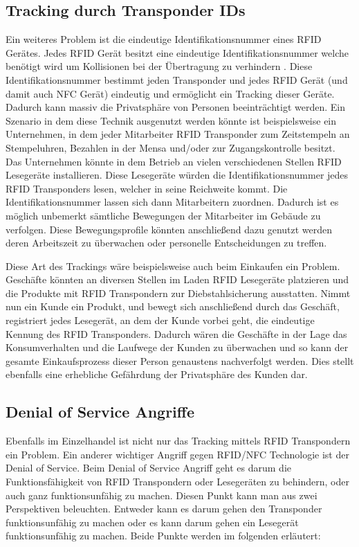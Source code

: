 \documentclass[conference]{IEEEtran}
\begin{document}
\subsection{Tracking durch Transponder IDs}
Ein weiteres Problem ist die eindeutige Identifikationsnummer eines RFID Gerätes. Jedes RFID Gerät besitzt eine eindeutige Identifikationsnummer welche benötigt wird um Kollisionen bei der Übertragung zu verhindern \cite{b3}. Diese Identifikationsnummer bestimmt jeden Transponder und jedes RFID Gerät (und damit auch NFC Gerät) eindeutig und ermöglicht ein Tracking dieser Geräte. Dadurch kann massiv die Privatsphäre von Personen beeinträchtigt werden. Ein Szenario in dem diese Technik ausgenutzt werden könnte ist beispielsweise ein Unternehmen, in dem jeder Mitarbeiter RFID Transponder zum Zeitstempeln an Stempeluhren, Bezahlen in der Mensa und/oder zur Zugangskontrolle besitzt. Das Unternehmen könnte in dem Betrieb an vielen verschiedenen Stellen RFID Lesegeräte installieren. Diese Lesegeräte würden die Identifikationsnummer jedes RFID Transponders lesen, welcher in seine Reichweite kommt. Die Identifikationsnummer lassen sich dann Mitarbeitern zuordnen. Dadurch ist es möglich unbemerkt sämtliche Bewegungen der Mitarbeiter im Gebäude zu verfolgen. Diese Bewegungsprofile könnten anschließend dazu genutzt werden deren Arbeitszeit zu überwachen oder personelle Entscheidungen zu treffen.

Diese Art des Trackings wäre beispielsweise auch beim Einkaufen ein Problem. Geschäfte könnten an diversen Stellen im Laden RFID Lesegeräte platzieren und die Produkte mit RFID Transpondern zur Diebstahlsicherung ausstatten. Nimmt nun ein Kunde ein Produkt, und bewegt sich anschließend durch das Geschäft, registriert jedes Lesegerät, an dem der Kunde vorbei geht, die eindeutige Kennung des RFID Transponders. Dadurch wären die Geschäfte in der Lage das Konsumverhalten und die Laufwege der Kunden zu überwachen und so kann der gesamte Einkaufsprozess dieser Person genaustens nachverfolgt werden. Dies stellt ebenfalls eine erhebliche Gefährdung der Privatsphäre des Kunden dar.

\subsection{Denial of Service Angriffe}
Ebenfalls im Einzelhandel ist nicht nur das Tracking mittels RFID Transpondern ein Problem. Ein anderer wichtiger Angriff gegen RFID/NFC Technologie ist der Denial of Service. Beim Denial of Service Angriff geht es darum die Funktionsfähigkeit von RFID Transpondern oder Lesegeräten zu behindern, oder auch ganz funktionsunfähig zu machen. Diesen Punkt kann man aus zwei Perspektiven beleuchten. Entweder kann es darum gehen den Transponder funktionsunfähig zu machen oder es kann darum gehen ein Lesegerät funktionsunfähig zu machen. Beide Punkte werden im folgenden erläutert:
\end{document}
